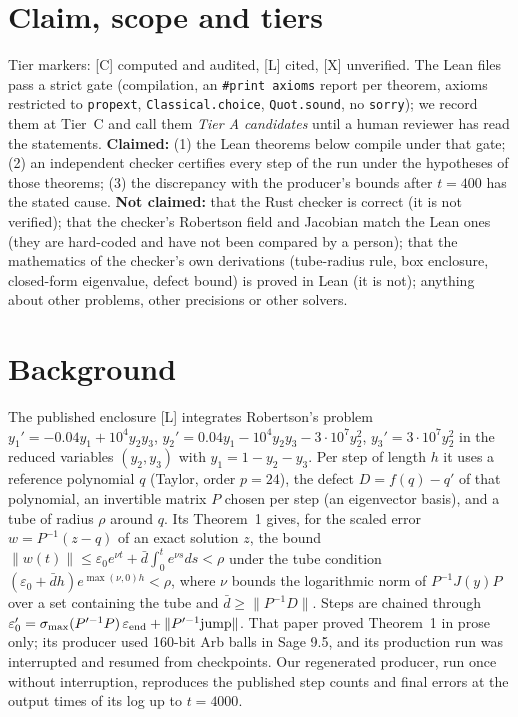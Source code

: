 \documentclass[11pt]{article}
\newcommand{\tier}[1]{\textsf{[#1]}}
\newcommand{\tC}{\tier{C}}
\newcommand{\tL}{\tier{L}}
\newcommand{\tX}{\tier{X}}
\newcommand{\nrm}[1]{\lVert #1\rVert}
\begin{document}
\section{Claim, scope and tiers}
Tier markers: \tC{} computed and audited, \tL{} cited, \tX{} unverified. The Lean files pass a strict gate (compilation, an
\texttt{\#print axioms} report per theorem, axioms restricted to \texttt{propext}, \texttt{Classical.choice}, \texttt{Quot.sound}, no
\texttt{sorry}); we record them at Tier~C and call them \emph{Tier A candidates} until a human reviewer has read the statements.
\textbf{Claimed:} (1) the Lean theorems below compile under that gate; (2) an independent checker certifies every step of the run
under the hypotheses of those theorems; (3) the discrepancy with the producer's bounds after $t=400$ has the stated cause.
\textbf{Not claimed:} that the Rust checker is correct (it is not verified); that the checker's Robertson field and Jacobian
match the Lean ones (they are hard-coded and have not been compared by a person); that the mathematics of the checker's own
derivations (tube-radius rule, box enclosure, closed-form eigenvalue, defect bound) is proved in Lean (it is not); anything about
other problems, other precisions or other solvers.

\section{Background}
The published enclosure \tL{} integrates Robertson's problem
$y_1'=-0.04y_1+10^4y_2y_3$, $y_2'=0.04y_1-10^4y_2y_3-3\cdot10^7y_2^2$, $y_3'=3\cdot10^7y_2^2$ in the reduced variables $(y_2,y_3)$ with
$y_1=1-y_2-y_3$. Per step of length $h$ it uses a reference polynomial $q$ (Taylor, order $p=24$), the defect $D=f(q)-q'$ of that
polynomial, an invertible matrix $P$ chosen per step (an eigenvector basis), and a tube of radius $\rho$ around $q$. Its Theorem~1
gives, for the scaled error $w=P^{-1}(z-q)$ of an exact solution $z$, the bound
$\nrm{w(t)}\le \varepsilon_0e^{\nu t}+\bar d\int_0^te^{\nu s}ds<\rho$ under the tube condition
$(\varepsilon_0+\bar dh)e^{\max(\nu,0)h}<\rho$, where $\nu$ bounds the logarithmic norm of $P^{-1}J(y)P$ over a set containing the tube and
$\bar d\ge\nrm{P^{-1}D}$. Steps are chained through $\varepsilon_0'=\sigma_{\max}(P'^{-1}P)\,\varepsilon_{\rm end}+\nrm{P'^{-1}\mathrm{jump}}$.
That paper proved Theorem~1 in prose only; its producer used 160-bit Arb balls in Sage 9.5, and its production run was interrupted and resumed from checkpoints.
Our regenerated producer, run once without interruption, reproduces the published step counts and final errors at the output times of its log up to $t=4000$.
\end{document}
